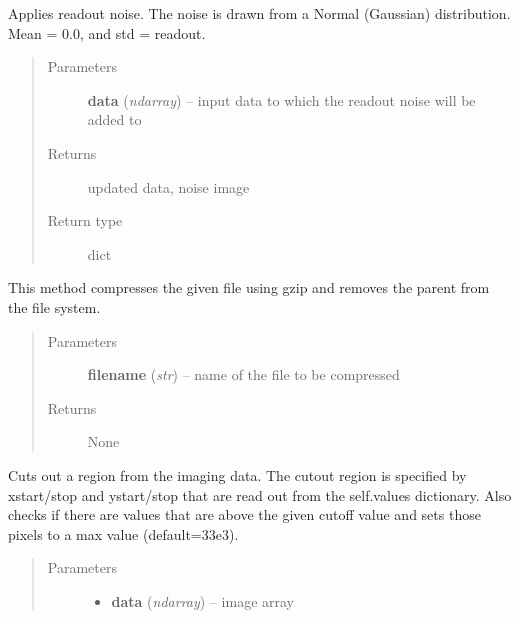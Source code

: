\documentclass[a4paper,11pt,english]{sphinxmanual}
\begin{document}
\begin{fulllineitems}
\begin{fulllineitems}
\label{postproc:postproc.postprocessing.PostProcessing.applyReadoutNoise}
Applies readout noise. The noise is drawn from a Normal (Gaussian) distribution.
Mean = 0.0, and std = readout.
\begin{quote}\begin{description}
\item[{Parameters}] \leavevmode
\textbf{data} (\emph{ndarray}) -- input data to which the readout noise will be added to

\item[{Returns}] \leavevmode
updated data, noise image

\item[{Return type}] \leavevmode
dict

\end{description}\end{quote}

\end{fulllineitems}


\begin{fulllineitems}
\label{postproc:postproc.postprocessing.PostProcessing.compressAndRemoveFile}
This method compresses the given file using gzip and removes the parent from
the file system.
\begin{quote}\begin{description}
\item[{Parameters}] \leavevmode
\textbf{filename} (\emph{str}) -- name of the file to be compressed

\item[{Returns}] \leavevmode
None

\end{description}\end{quote}

\end{fulllineitems}


\begin{fulllineitems}
\label{postproc:postproc.postprocessing.PostProcessing.cutoutRegion}
Cuts out a region from the imaging data. The cutout region is specified by
xstart/stop and ystart/stop that are read out from the self.values dictionary.
Also checks if there are values that are above the given cutoff value and sets
those pixels to a max value (default=33e3).
\begin{quote}\begin{description}
\item[{Parameters}] \leavevmode\begin{itemize}
\item {} 
\textbf{data} (\emph{ndarray}) -- image array


\end{itemize}
\end{description}
\end{quote}
\end{fulllineitems}
\end{fulllineitems}
\end{document}
